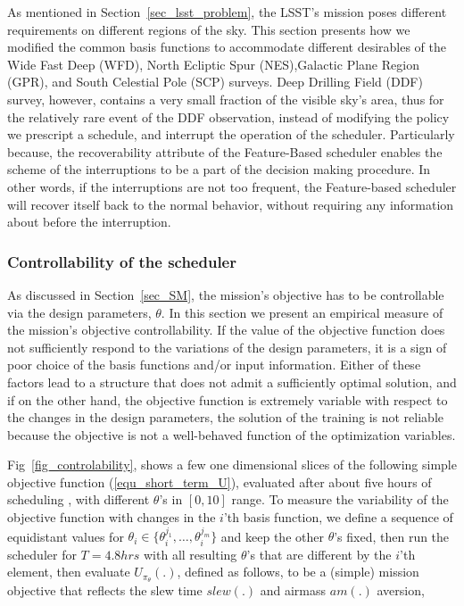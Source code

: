 \documentclass[12pt]{aastex62}
\theoremstyle{definition}
\begin{document}
As mentioned in Section~\ref{sec_lsst_problem}, the LSST's mission poses different requirements on different regions of the sky. This section presents how we modified the common basis functions to accommodate different desirables of the Wide Fast Deep (WFD), North Ecliptic Spur (NES),Galactic Plane Region (GPR), and South Celestial Pole (SCP)  surveys. Deep Drilling Field (DDF) survey, however, contains a very small fraction of the visible sky's area, thus for the relatively rare event of the DDF observation, instead of modifying the policy we prescript a schedule, and interrupt the operation of the scheduler. Particularly because, the recoverability attribute of the Feature-Based scheduler enables the scheme of the interruptions to be a part of the decision making procedure. In other words, if the interruptions are not too frequent, the Feature-based scheduler will recover itself back to the normal behavior, without requiring any information about before the interruption. 

\subsubsection{Controllability of the scheduler}\label{sec_sim_cont}

As discussed in Section~\ref{sec_SM}, the mission's objective has to be controllable via the design parameters, $\theta$. In this section we present an empirical measure of the mission's objective controllability. If the value of the objective function does not sufficiently respond to the variations of the design parameters, it is a sign of poor choice of the basis functions and/or input information. Either of these factors lead to a structure that does not admit a sufficiently optimal solution, and if on the other hand, the objective function is extremely variable with respect to the changes in the design parameters, the solution of the training is not reliable because the objective is not a well-behaved function of the optimization variables.

Fig~\ref{fig_controlability}, shows a few one dimensional slices of the following simple objective function (\ref{equ_short_term_U}), evaluated after about five hours of scheduling , with different $\theta$'s in $[0,10]$ range. To measure the variability of the objective function with changes in the $i$'th basis function, we define a sequence of equidistant values for $\theta_i \in \{\theta_i^{j_1},\dots,\theta_i^{j_m}\}$ and keep the other $\theta$'s fixed, then run the scheduler for $T = 4.8 hrs$ with all resulting $\theta$'s that are different by the $i$'th element, then evaluate $U_{\pi_{\theta}}(.)$, defined as follows, to be a (simple) mission objective that reflects the slew time $slew(.)$ and airmass $am(.)$ aversion,
\end{document}

